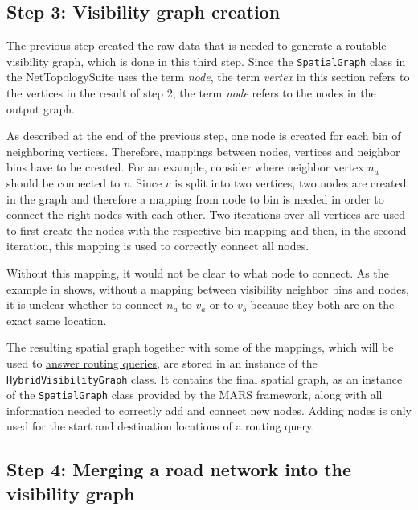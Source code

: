 	\subsection{Step 3: Visibility graph creation}
	\label{subsec:step-3-graph-creation}
	
		The previous step created the raw data that is needed to generate a routable visibility graph, which is done in this third step.
		Since the \texttt{SpatialGraph} class in the NetTopologySuite uses the term \emph{node}, the term \emph{vertex} in this section refers to the vertices in the result of step 2, the term \emph{node} refers to the nodes in the output graph.
		
		As described at the end of the previous step, one node is created for each bin of neighboring vertices.
		Therefore, mappings between nodes, vertices and neighbor bins have to be created.
		For an example, consider  where neighbor vertex $n_a$ should be connected to $v$.
		Since $v$ is split into two vertices, two nodes are created in the graph and therefore a mapping from node to bin is needed in order to connect the right nodes with each other.
		Two iterations over all vertices are used to first create the nodes with the respective bin-mapping and then, in the second iteration, this mapping is used to correctly connect all nodes.
		
		Without this mapping, it would not be clear to what node to connect.
		As the example in  shows, without a mapping between visibility neighbor bins and nodes, it is unclear whether to connect $n_a$ to $v_a$ or to $v_b$ because they both are on the exact same location.
		
		The resulting spatial graph together with some of the mappings, which will be used to \hyperref[sec:answering-queries]{answer routing queries}, are stored in an instance of the \texttt{HybridVisibilityGraph} class.
		It contains the final spatial graph, as an instance of the \texttt{SpatialGraph} class provided by the MARS framework, along with all information needed to correctly add and connect new nodes.
		Adding nodes is only used for the start and destination locations of a routing query.
		
	\subsection{Step 4: Merging a road network into the visibility graph}
	\label{subsec:step-4-graph merging}
	
